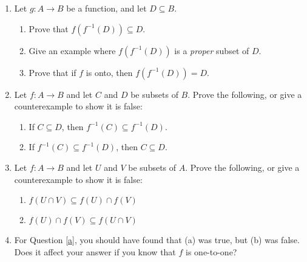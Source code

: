 \documentclass[letterpaper,12pt]{article}
\begin{document}
\begin{enumerate}
\begin{enumerate}
\end{enumerate}
\item Let $g:A\to B$ be a function, and let $D\subseteq B$.
\begin{enumerate}
 \item Prove that $f(f^{-1}(D))\subseteq D$.
 \item Give an example where $f(f^{-1}(D))$ is a {\em proper} subset of $D$.
 \item Prove that if $f$ is onto, then $f(f^{-1}(D))=D$.
\end{enumerate}
\item Let $f:A\to B$ and let $C$ and $D$ be subsets of $B$. Prove the following, or give a counterexample to show it is false:
\begin{enumerate}
 \item If $C\subseteq D$, then $f^{-1}(C)\subseteq f^{-1}(D)$.
 \item If $f^{-1}(C)\subseteq f^{-1}(D)$, then $C\subseteq D$. 
\end{enumerate}
\item Let $f:A\to B$ and let $U$ and $V$ be subsets of $A$. Prove the following, or give a counterexample to show it is false:\label{a}
\begin{enumerate}
 \item $f(U\cap V)\subseteq f(U)\cap f(V)$
 \item $f(U)\cap f(V) \subseteq f(U\cap V)$
\end{enumerate}
\item For Question \ref{a}, you should have found that (a) was true, but (b) was false. Does it affect your answer if you know that $f$ is one-to-one?

\end{enumerate}
\end{document}

